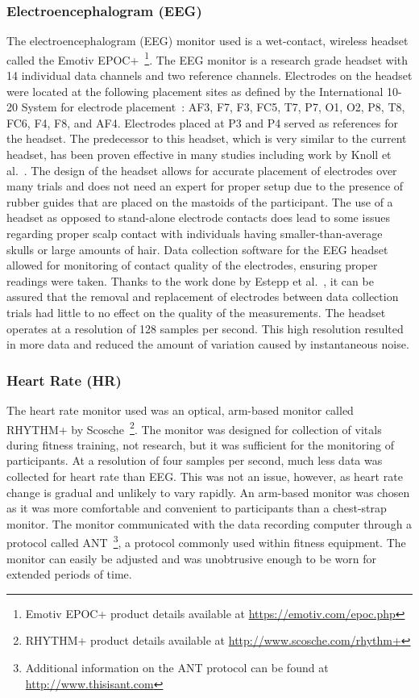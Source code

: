 \documentclass[11pt]{article}
\begin{document}
		\subsubsection{Electroencephalogram (EEG)}
		The electroencephalogram (EEG) monitor used is a wet-contact, wireless headset called the Emotiv EPOC+~\footnote{Emotiv EPOC+ product details available at \url{https://emotiv.com/epoc.php}}. The EEG monitor is a research grade headset with 14 individual data channels and two reference channels. Electrodes on the headset were located at the following placement sites as defined by the International 10-20 System for electrode placement~\cite{Jasper}: AF3, F7, F3, FC5, T7, P7, O1, O2, P8, T8, FC6, F4, F8, and AF4. Electrodes placed at P3 and P4 served as references for the headset. The predecessor to this headset, which is very similar to the current headset, has been proven effective in many studies including work by Knoll et al.~\cite{Knoll}. The design of the headset allows for accurate placement of electrodes over many trials and does not need an expert for proper setup due to the presence of rubber guides that are placed on the mastoids of the participant. The use of a headset as opposed to stand-alone electrode contacts does lead to some issues regarding proper scalp contact with individuals having smaller-than-average skulls or large amounts of hair. Data collection software for the EEG headset allowed for monitoring of contact quality of the electrodes, ensuring proper readings were taken. Thanks to the work done by Estepp et al.~\cite{Estepp_2015}, it can be assured that the removal and replacement of electrodes between data collection trials had little to no effect on the quality of the measurements. The headset operates at a resolution of 128 samples per second. This high resolution resulted in more data and reduced the amount of variation caused by instantaneous noise.
			
		\subsubsection{Heart Rate (HR)}
		The heart rate monitor used was an optical, arm-based monitor called RHYTHM+ by Scosche~\footnote{RHYTHM+ product details available at \url{http://www.scosche.com/rhythm+}}. The monitor was designed for collection of vitals during fitness training, not research, but it was sufficient for the monitoring of participants. At a resolution of four samples per second, much less data was collected for heart rate than EEG. This was not an issue, however, as heart rate change is gradual and unlikely to vary rapidly. An arm-based monitor was chosen as it was more comfortable and convenient to participants than a chest-strap monitor. The monitor communicated with the data recording computer through a protocol called ANT~\footnote{Additional information on the ANT protocol can be found at \url{http://www.thisisant.com}}, a protocol commonly used within fitness equipment.  The monitor can easily be adjusted and was unobtrusive enough to be worn for extended periods of time.
		
\end{document}
